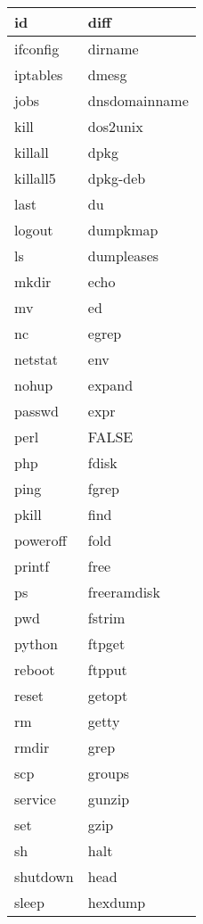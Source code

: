 \begin{longtable}{p{64mm}p{64mm}}
     \hline
     id & diff \\
     \hline
     ifconfig & dirname \\
     \hline
     iptables & dmesg \\
     \hline
     jobs & dnsdomainname \\
     \hline
     kill & dos2unix \\
     \hline
     killall & dpkg \\
     \hline
     killall5 & dpkg-deb \\
     \hline
     last & du \\
     \hline
     logout & dumpkmap \\
     \hline
     ls & dumpleases \\
     \hline
     mkdir & echo \\
     \hline
     mv & ed \\
     \hline
     nc & egrep \\
     \hline
     netstat & env \\
     \hline
     nohup & expand \\
     \hline
     passwd & expr \\
     \hline
     perl & FALSE \\
     \hline
     php & fdisk \\
     \hline
     ping & fgrep \\
     \hline
     pkill & find \\
     \hline
     poweroff & fold \\
     \hline
     printf & free \\
     \hline
     ps & freeramdisk \\
     \hline
     pwd & fstrim \\
     \hline
     python & ftpget \\
     \hline
     reboot & ftpput \\
     \hline
     reset & getopt \\
     \hline
     rm & getty \\
     \hline
     rmdir & grep \\
     \hline
     scp & groups \\
     \hline
     service & gunzip \\
     \hline
     set & gzip \\
     \hline
     sh & halt \\
     \hline
     shutdown & head \\
     \hline
     sleep & hexdump \\

\end{longtable}
